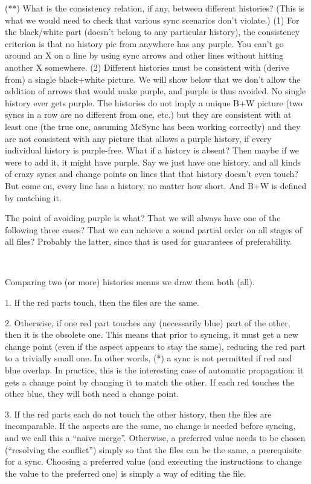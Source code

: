 \documentclass{book}
\begin{document}
(**) What is the consistency relation, if any, between different histories?  (This is what we would need to check that various sync scenarios don't violate.)  (1) For the black/white part (doesn't belong to any particular history), the consistency criterion is that no history pic from anywhere has any purple.  You can't go around an X on a line by using sync arrows and other lines without hitting another X somewhere.  (2) Different histories must be consistent with (derive from) a single black+white picture.  We will show below that we don't allow the addition of arrows that would make purple, and purple is thus avoided.  No single history ever gets purple.  The histories do not imply a unique B+W picture (two syncs in a row are no different from one, etc.) but they are consistent with at least one (the true one, assuming McSync has been working correctly) and they are not consistent with any picture that allows a purple history, if every individual history is purple-free.  What if a history is absent?  Then maybe if we were to add it, it might have purple.  Say we just have one history, and all kinds of crazy syncs and change points on lines that that history doesn't even touch?  But come on, every line has a history, no matter how short.  And B+W is defined by matching it.

The point of avoiding purple is what?  That we will always have one of the following three cases?  That we can achieve a sound partial order on all stages of all files?  Probably the latter, since that is used for guarantees of preferability.

~

Comparing two (or more) histories means we draw them both (all).

1. If the red parts touch, then the files are the same.

2. Otherwise, if one red part touches any (necessarily blue) part of the other, then it is the obsolete one.  This means that prior to syncing, it must get a new change point (even if the aspect appears to stay the same), reducing the red part to a trivially small one.  In other words, (*) a sync is not permitted if red and blue overlap.  In practice, this is the interesting case of automatic propagation: it gets a change point by changing it to match the other.  If each red touches the other blue, they will both need a change point.

3. If the red parts each do not touch the other history, then the files are incomparable.  If the aspects are the same, no change is needed before syncing, and we call this a ``naive merge''.  Otherwise, a preferred value needs to be chosen (``resolving the conflict'') simply so that the files can be the same, a prerequisite for a sync.  Choosing a preferred value (and executing the instructions to change the value to the preferred one) is simply a way of editing the file.
\end{document}
